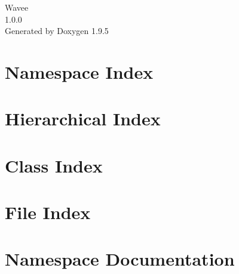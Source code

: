 \documentclass[twoside]{book}
\newcommand{\+}{\discretionary{\mbox{\scriptsize$\hookleftarrow$}}{}{}}
\newcommand{\clearemptydoublepage}{%
    \newpage{\pagestyle{empty}\cleardoublepage}%
  }
\begin{document}
  \raggedbottom
    \hypersetup{pageanchor=false,
                bookmarksnumbered=true,
                pdfencoding=unicode
               }
  \begin{titlepage}
  \vspace*{7cm}
  \begin{center}%
  {\Large Wavee}\\
  [1ex]\large 1.\+0.\+0 \\
  \vspace*{1cm}
  {\large Generated by Doxygen 1.9.5}\\
  \end{center}
  \end{titlepage}
  \clearemptydoublepage
  \tableofcontents
  \clearemptydoublepage
  \hypersetup{pageanchor=true}
\chapter{Namespace Index}

\chapter{Hierarchical Index}

\chapter{Class Index}

\chapter{File Index}

\chapter{Namespace Documentation}
















\end{document}
